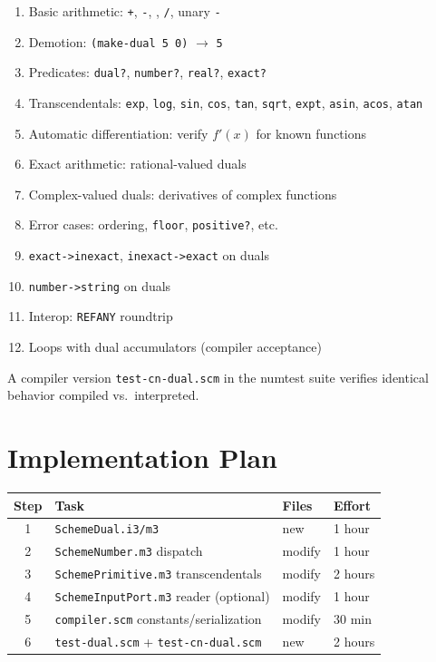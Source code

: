 \documentclass[12pt]{report}
\begin{document}
\begin{enumerate}[nosep]
\item Basic arithmetic: {\tt +}, {\tt -}, {\tt *}, {\tt /}, unary {\tt -}
\item Demotion: {\tt (make-dual 5 0)} $\to$ {\tt 5}
\item Predicates: {\tt dual?}, {\tt number?}, {\tt real?}, {\tt exact?}
\item Transcendentals: {\tt exp}, {\tt log}, {\tt sin}, {\tt cos},
  {\tt tan}, {\tt sqrt}, {\tt expt}, {\tt asin}, {\tt acos}, {\tt atan}
\item Automatic differentiation: verify $f'(x)$ for known functions
\item Exact arithmetic: rational-valued duals
\item Complex-valued duals: derivatives of complex functions
\item Error cases: ordering, {\tt floor}, {\tt positive?}, etc.
\item {\tt exact->inexact}, {\tt inexact->exact} on duals
\item {\tt number->string} on duals
\item Interop: {\tt REFANY} roundtrip
\item Loops with dual accumulators (compiler acceptance)
\end{enumerate}

A compiler version {\tt test-cn-dual.scm} in the numtest suite
verifies identical behavior compiled vs.\ interpreted.

\chapter{Implementation Plan}

\begin{center}
\begin{tabular}{clll}
\toprule
Step & Task & Files & Effort \\
\midrule
1 & {\tt SchemeDual.i3/m3} & new & 1 hour \\
2 & {\tt SchemeNumber.m3} dispatch & modify & 1 hour \\
3 & {\tt SchemePrimitive.m3} transcendentals & modify & 2 hours \\
4 & {\tt SchemeInputPort.m3} reader (optional) & modify & 1 hour \\
5 & {\tt compiler.scm} constants/serialization & modify & 30 min \\
6 & {\tt test-dual.scm} + {\tt test-cn-dual.scm} & new & 2 hours \\
\bottomrule
\end{tabular}
\end{center}
\end{document}
